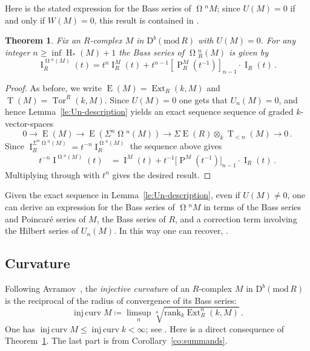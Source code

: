 \documentclass{amsart}
\numberwithin{equation}{section}
\theoremstyle{plain}
\newtheorem{theorem}[equation]{Theorem}
\theoremstyle{definition}
\theoremstyle{remark}
\newcommand{\dbcat}[1]{\mathrm{D}^b(\mathrm{mod}\,{#1})}
\newcommand{\bass}{\operatorname{I}}
\newcommand{\betti}{\operatorname{P}}
\newcommand{\eee}{\operatorname{E}}
\newcommand{\ext}{\operatorname{Ext}}
\newcommand{\hh}{\operatorname{H}}
\newcommand{\injcurv}{\operatorname{inj\,curv}}
\newcommand{\rank}{\mathrm{rank}}
\newcommand{\syz}{\operatorname{\Omega}\!}
\newcommand{\tee}{\operatorname{T}}
\newcommand{\tor}{\operatorname{Tor}}
\begin{document}
Here is the stated expression for the Bass series of $\syz^nM$; since $U(M)=0$ if and only if $W(M)=0$, this result is contained in \cite[Theorem~2.2]{Lescot:1986}. 

\begin{theorem}
\label{th:bass-series-formula}
Fix an $R$-complex $M$ in $\dbcat R$ with $U(M)=0$. For any integer $n\ge \inf\hh_*(M)+1$ the Bass series of $\syz^n_R(M)$ is given by
    \[
    \bass_R^{\syz^n(M)}(t) =  t^{n}\bass_R^M(t) + t^{n-1}[\betti_R^M(t^{-1})]_{n-1}  \cdot \bass_R(t)\,.
    \]
\end{theorem}

\begin{proof}
As before, we write $\eee(M)=\ext_R(k,M)$ and $\tee(M)=\tor^R(k,M)$. Since $U(M)=0$ one gets that $U_n(M)=0$, and hence Lemma~\ref{le:Un-description} yields an  exact sequence sequence of graded $k$-vector-spaces 
    \[
0\longrightarrow \eee(M) \longrightarrow
        \eee(\Sigma^n \syz^n(M)) \longrightarrow
            \Sigma \eee(R)\otimes_k \tee_{<n}(M) \longrightarrow 0\,.
    \]
Since $\bass_R^{\Sigma^n \syz^n(M)} =t^{-n}\bass_R^{\syz^n(M)}$  the sequence above gives
    \begin{align*}
    t^{-n}\bass^{\syz^n(M)}(t)
        &= \bass^M(t) + t^{-1}\big[\betti^M(t^{-1})\big]_{n-1} \cdot \bass_R(t)\,.
    \end{align*}
Multiplying through with $t^n$ gives the desired result. 
\end{proof}

Given the exact sequence in Lemma~\ref{le:Un-description}, even if $U(M)\ne 0$, one can derive an expression for the Bass series of $\syz^nM$ in terms of the Bass series and Poincar\'e series of $M$, the Bass series of $R$, and a correction term involving the Hilbert series of $U_n(M)$. In this way one can recover, \cite[Theorem~2.2]{Lescot:1986}.


\subsection*{Curvature}
Following Avramov~\cite{Avramov:1996}, the \emph{injective curvature} of an $R$-complex $M$ in $\dbcat R$ is the reciprocal of the radius of convergence of its Bass series:
\[
\injcurv M \coloneqq \limsup_n \sqrt[n]{\rank_k\ext^n_R(k,M)}\,.
\]
One has $\injcurv M\le \injcurv k<\infty$; see \cite[Proposition~2]{Avramov:1996}. Here is a direct consequence of Theorem~\ref{th:bass-series-formula}. The last part is from Corollary~\ref{co:summands}. 
\end{document}

